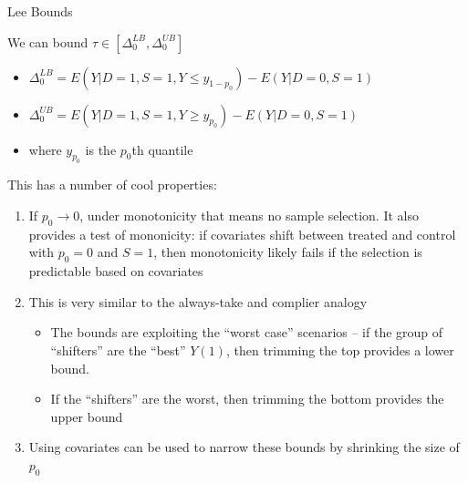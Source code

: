\documentclass[notes,11pt, aspectratio=169]{beamer}
\newenvironment{wideitemize}{\itemize\addtolength{\itemsep}{10pt}}{\enditemize}
\begin{document}
\begin{frame}{Lee Bounds}
  \begin{wideitemize}
  \item We can bound $\tau \in [\Delta_{0}^{LB}, \Delta_{0}^{UB}]$
    \begin{itemize}
    \item $\Delta_{0}^{LB} = E(Y | D = 1, S = 1, Y \leq y_{1-p_{0}}) - E(Y | D = 0, S = 1)$
    \item $\Delta_{0}^{UB} = E(Y | D = 1, S = 1, Y \geq y_{p_{0}}) - E(Y | D = 0, S = 1)$
    \item where $y_{p_{0}}$ is the $p_{0}$th quantile
    \end{itemize}
  \item This has a number of cool properties:
    \begin{enumerate}
    \item If $p_{0} \to 0$, under monotonicity that means no sample
      selection. It also provides a test of mononicity: if covariates
      shift between treated and control with $p_{0} = 0$ and $S = 1$,
      then monotonicity likely fails if the selection is predictable based on covariates
    \item This is very similar to the always-take and complier analogy
      \begin{itemize}
      \item The bounds are exploiting the ``worst case'' scenarios --
        if the group of ``shifters'' are the ``best'' $Y(1)$, then
        trimming the top provides a lower bound.
      \item If the ``shifters'' are the worst, then trimming the bottom
        provides the upper bound
      \end{itemize}
    \item Using covariates can be used to narrow these bounds by shrinking the size of $p_{0}$
    \end{enumerate}
  \end{wideitemize}
\end{frame}
\end{document}
